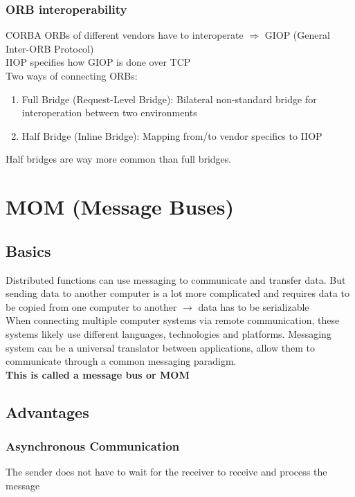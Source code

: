 			\pagebreak %
			
			\subsubsection{ORB interoperability}
			CORBA ORBs of different vendors have to interoperate $ \Rightarrow $ GIOP (General Inter-ORB Protocol)\\
			IIOP specifies how GIOP is done over TCP\\
			Two ways of connecting ORBs: 
			\begin{enumerate}
				\item Full Bridge (Request-Level Bridge): Bilateral non-standard bridge for interoperation
				between two environments
				
				\item Half Bridge (Inline Bridge): Mapping from/to vendor specifics to IIOP
			\end{enumerate}
			Half bridges are way more common than full bridges.
			
			
			
	\section{MOM (Message Buses)}
		\subsection{Basics}
			Distributed functions can use messaging to communicate and transfer data. But sending data to another computer is a lot more complicated and requires data to be copied from one computer to another $ \rightarrow $ data has to be serializable\\
			When connecting multiple computer systems via remote communication, these systems likely use different languages, technologies and platforms. Messaging system can be a universal translator between
			applications, allow them to communicate through a common messaging paradigm.\\
			\textbf{This is called a message bus or MOM}
			
			
			
		\subsection{Advantages}
			\subsubsection{Asynchronous Communication}
				The sender does not have to wait for the receiver to receive and process the message
